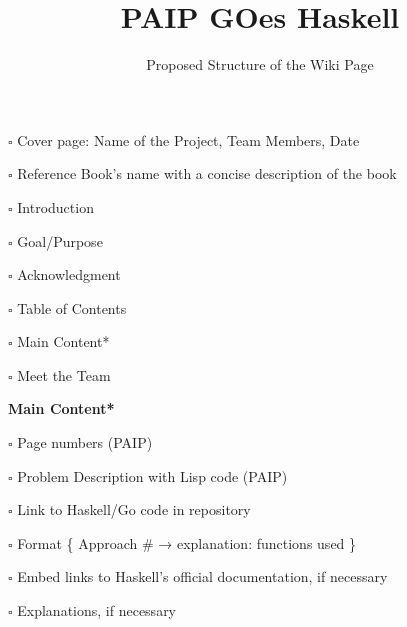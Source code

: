 \documentclass[12pt]{article} %
\title{PAIP GOes Haskell}
\author{Proposed Structure of the Wiki Page} %
\date{} %
\newcommand{\incomplete}{$\square$}
\theoremstyle{definition}
\begin{document}
\maketitle


\incomplete \hspace{7pt} Cover page: Name of the Project, Team Members, Date
\vspace{5pt}

\incomplete \hspace{7pt} Reference Book's name with a concise description of the book
\vspace{5pt}

\incomplete \hspace{7pt} Introduction 
\vspace{5pt}

\hspace{1cm}\incomplete \hspace{7pt} Goal/Purpose
\vspace{5pt}

\hspace{1cm}\incomplete \hspace{7pt} Acknowledgment
\vspace{5pt}

\incomplete \hspace{7pt} Table of Contents
\vspace{5pt}

\incomplete \hspace{7pt} Main Content*
\vspace{5pt}

\incomplete \hspace{7pt} Meet the Team

\vspace{1cm}
\textbf{Main Content*}
\vspace{3pt}

\incomplete \hspace{7pt} Page numbers (PAIP)
\vspace{5pt}

\incomplete \hspace{7pt} Problem Description with Lisp code (PAIP)
\vspace{5pt}

\incomplete \hspace{7pt} Link to Haskell/Go code in repository 
\vspace{5pt}

\hspace{1cm} \incomplete \hspace{7pt} Format \{ Approach \# → explanation: functions used \}
\vspace{5pt}

\incomplete \hspace{7pt} Embed links to Haskell’s official documentation, if necessary
\vspace{5pt}

\incomplete \hspace{7pt} Explanations, if necessary
\end{document}
